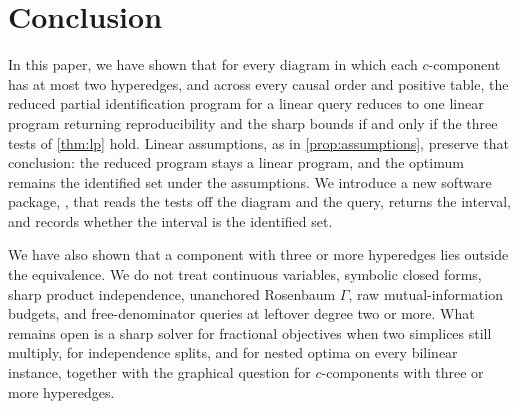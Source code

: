 \section{Conclusion}
\label{sec:conclusion}

In this paper, we have shown that for every diagram in which each $c$-component has at most two hyperedges, and across every causal order and positive table, the reduced partial identification program for a linear query reduces to one linear program returning reproducibility and the sharp bounds if and only if the three tests of \cref{thm:lp} hold. Linear assumptions, as in \cref{prop:assumptions}, preserve that conclusion: the reduced program stays a linear program, and the optimum remains the identified set under the assumptions. We introduce a new software package, \pid{}, that reads the tests off the diagram and the query, returns the interval, and records whether the interval is the identified set.

We have also shown that a component with three or more hyperedges lies outside the equivalence. We do not treat continuous variables, symbolic closed forms, sharp product independence, unanchored Rosenbaum $\Gamma$, raw mutual-information budgets, and free-denominator queries at leftover degree two or more. What remains open is a sharp solver for fractional objectives when two simplices still multiply, for independence splits, and for nested optima on every bilinear instance, together with the graphical question for $c$-components with three or more hyperedges. 
